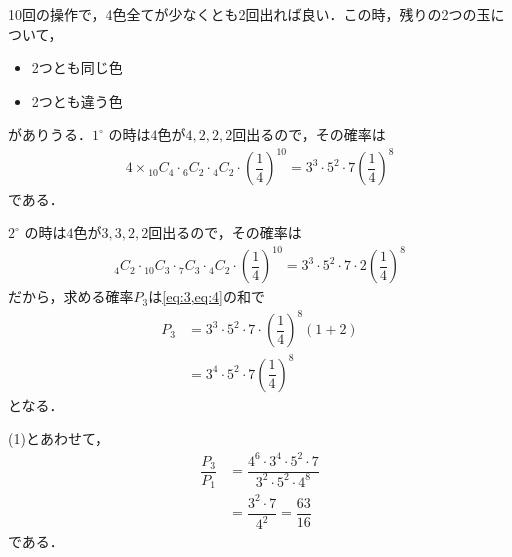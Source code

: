 \documentclass[../../main.tex]{subfiles}
\begin{document}
10回の操作で，4色全てが少なくとも2回出れば良い．この時，残りの2つの玉について，
\begin{itemize}
  \item[$1^\circ$] 2つとも同じ色
  \item[$2^\circ$] 2つとも違う色
\end{itemize}
がありうる．$1^\circ$ の時は$4$色が$4,2,2,2$回出るので，その確率は
\begin{align}
  4 \times {}_{10}C_{4} \cdot {}_{6}C_{2} \cdot {}_{4}C_{2} \cdot \left(\dfrac{1}{4}\right)^{10} = 3^3 \cdot 5^2 \cdot 7 \left(\dfrac{1}{4}\right)^8 \label{eq:3}
\end{align}
である．

$2^\circ$ の時は$4$色が$3,3,2,2$回出るので，その確率は
\begin{align}
  {}_{4}C_{2} \cdot {}_{10}C_{3} \cdot {}_{7}C_{3} \cdot {}_{4}C_{2} \cdot \left(\dfrac{1}{4}\right)^{10} = 3^3 \cdot 5^2 \cdot 7 \cdot 2 \left(\dfrac{1}{4}\right)^8 \label{eq:4}
\end{align}
だから，求める確率$P_3$は\cref{eq:3,eq:4}の和で
\begin{align}
  P_3
  &= 3^3 \cdot 5^2 \cdot 7 \cdot \left(\dfrac{1}{4}\right)^8 (1+2) \\
  &= 3^4 \cdot 5^2 \cdot 7 \left(\dfrac{1}{4}\right)^8
\end{align}
となる．

(1)とあわせて，
\begin{align}
  \dfrac{P_3}{P_1}
  &= \dfrac{4^6 \cdot 3^4 \cdot 5^2 \cdot 7}{3^2 \cdot 5^2 \cdot 4^8} \\
  &= \dfrac{3^2 \cdot 7}{4^2} = \dfrac{63}{16}
\end{align}
である．
\end{document}
